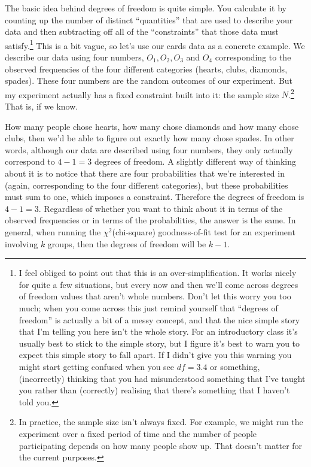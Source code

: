 \documentclass[
  a4paper,
]{book}
\begin{document}
The basic idea behind degrees of freedom is quite simple. You calculate
it by counting up the number of distinct ``quantities'' that are used to
describe your data and then subtracting off all of the ``constraints''
that those data must satisfy.\footnote{I feel obliged to point out that
  this is an over-simplification. It works nicely for quite a few
  situations, but every now and then we'll come across degrees of
  freedom values that aren't whole numbers. Don't let this worry you too
  much; when you come across this just remind yourself that ``degrees of
  freedom'' is actually a bit of a messy concept, and that the nice
  simple story that I'm telling you here isn't the whole story. For an
  introductory class it's usually best to stick to the simple story, but
  I figure it's best to warn you to expect this simple story to fall
  apart. If I didn't give you this warning you might start getting
  confused when you see \(df = 3.4\) or something, (incorrectly)
  thinking that you had misunderstood something that I've taught you
  rather than (correctly) realising that there's something that I
  haven't told you.} This is a bit vague, so let's use our cards data as
a concrete example. We describe our data using four numbers,
\(O_1, O_2, O_3\) and \(O_4\) corresponding to the observed frequencies
of the four different categories (hearts, clubs, diamonds, spades).
These four numbers are the random outcomes of our experiment. But my
experiment actually has a fixed constraint built into it: the sample
size \(N\).\footnote{In practice, the sample size isn't always fixed.
  For example, we might run the experiment over a fixed period of time
  and the number of people participating depends on how many people show
  up. That doesn't matter for the current purposes.} That is, if we
know.

How many people chose hearts, how many chose diamonds and how many chose
clubs, then we'd be able to figure out exactly how many chose spades. In
other words, although our data are described using four numbers, they
only actually correspond to \(4 - 1 = 3\) degrees of freedom. A slightly
different way of thinking about it is to notice that there are four
probabilities that we're interested in (again, corresponding to the four
different categories), but these probabilities must sum to one, which
imposes a constraint. Therefore the degrees of freedom is \(4 - 1 = 3\).
Regardless of whether you want to think about it in terms of the
observed frequencies or in terms of the probabilities, the answer is the
same. In general, when running the \(\chi^2\)(chi-square)
goodness-of-fit test for an experiment involving \(k\) groups, then the
degrees of freedom will be \(k - 1\).
\end{document}
